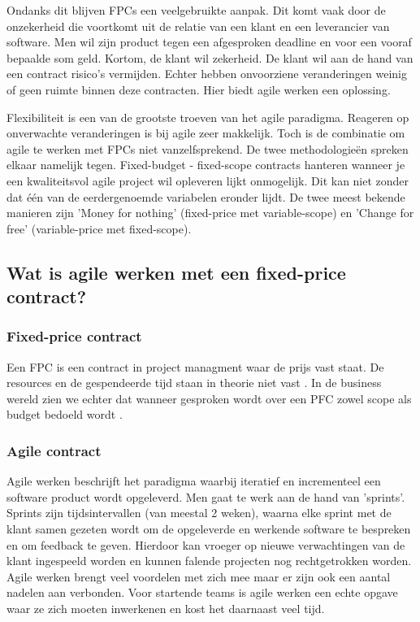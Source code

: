 \documentclass{hogent-article}
\begin{document}
    Ondanks dit blijven FPCs een veelgebruikte aanpak. Dit komt vaak door de onzekerheid die voortkomt uit de relatie van een klant en een leverancier van software. Men wil zijn product tegen een afgesproken deadline en voor een vooraf bepaalde som geld. Kortom, de klant wil zekerheid. De klant wil aan de hand van een contract risico's vermijden. Echter hebben onvoorziene veranderingen 
    weinig of geen ruimte binnen deze contracten. Hier biedt agile werken een oplossing.
    
    Flexibiliteit is een van de grootste troeven van het agile paradigma. Reageren op onverwachte veranderingen is bij agile zeer makkelijk. Toch is de combinatie om agile te werken met FPCs niet vanzelfsprekend. De twee methodologieën spreken elkaar namelijk tegen. Fixed-budget - fixed-scope contracts hanteren wanneer je een kwaliteitsvol agile project wil opleveren lijkt onmogelijk. Dit kan niet zonder dat één van de eerdergenoemde variabelen eronder lijdt. De twee meest bekende manieren zijn 'Money for nothing' (fixed-price met variable-scope) en 'Change for free' (variable-price met fixed-scope). 
	
    \subsection{Wat is agile werken met een fixed-price contract?}
    \subsubsection{Fixed-price contract}
     Een FPC is een contract in project managment waar de prijs vast staat. De resources en de gespendeerde tijd staan in theorie niet vast \autocite{PMK}. In de business wereld zien we echter dat wanneer gesproken wordt over een PFC zowel scope als budget bedoeld wordt \autocite{PMI2011}.
     \subsubsection{Agile contract}
     Agile werken beschrijft het paradigma waarbij iteratief en incrementeel een software product wordt opgeleverd. Men gaat te werk aan de hand van 'sprints'. Sprints zijn tijdsintervallen (van meestal 2 weken), waarna elke sprint met de klant samen gezeten wordt om de opgeleverde en werkende software te bespreken en om feedback te geven. Hierdoor kan vroeger op nieuwe verwachtingen van de klant ingespeeld worden en kunnen falende projecten nog rechtgetrokken worden. Agile werken brengt veel voordelen met zich mee maar er zijn ook een aantal nadelen aan verbonden. Voor startende teams is agile werken een echte opgave waar ze zich moeten inwerkenen en kost het daarnaast veel tijd.
    
\end{document}
